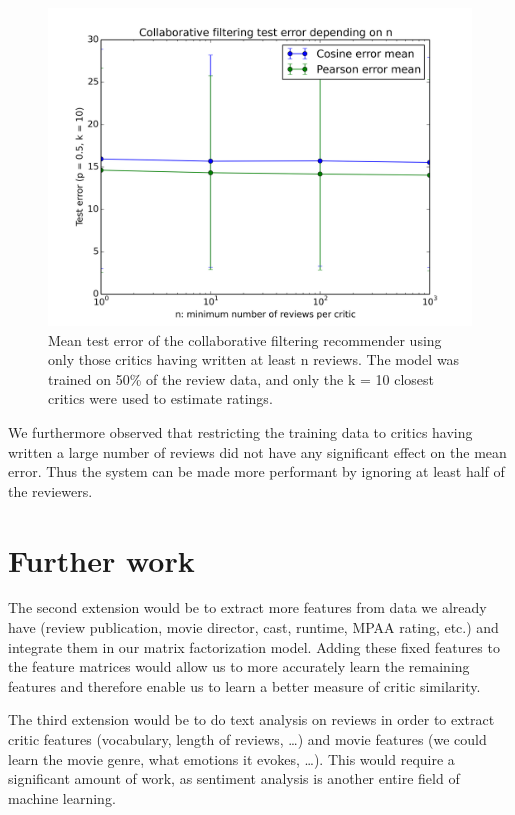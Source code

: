 \documentclass[12pt]{article}
\begin{document}
\begin{figure}[H]
\centering
\includegraphics[width=\textwidth]{../plots/collab/graph_n.png}
\caption{Mean test error of the collaborative filtering recommender using only
    those critics having written at least n reviews. The model was trained on
    50\% of the review data, and only the k = 10 closest critics were used to
    estimate ratings.}
\label{fig:collab_p}
\end{figure}

We furthermore observed that restricting the training data to critics having
written a large number of reviews did not have any significant effect on the
mean error. Thus the system can be made more performant by ignoring at least
half of the reviewers.


\section{Further work}


The second extension would be to extract more features from data we already have (review publication, movie director, cast, runtime, MPAA rating, etc.) and integrate them in our matrix factorization model. Adding these fixed features to the feature matrices would allow us to more accurately learn the remaining features and therefore enable us to learn a better measure of critic similarity.

The third extension would be to do text analysis on reviews in order to extract critic features (vocabulary, length of reviews, \dots) and movie features (we could learn the movie genre, what emotions it evokes, \dots). This would require a significant amount of work, as sentiment analysis is another entire field of machine learning.

{}

\end{document}
